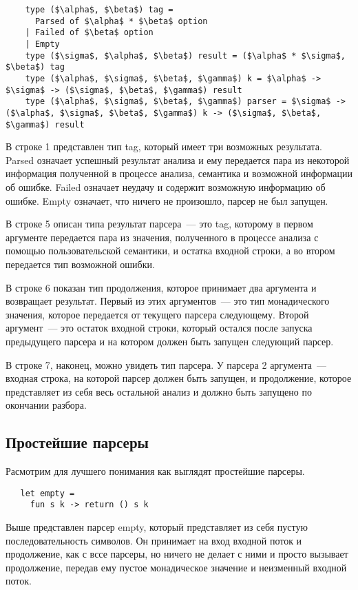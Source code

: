 \documentclass[conference]{IEEEtran}
\begin{document}
\begin{lstlisting}
    type ($\alpha$, $\beta$) tag =
      Parsed of $\alpha$ * $\beta$ option
    | Failed of $\beta$ option
    | Empty
    type ($\sigma$, $\alpha$, $\beta$) result = ($\alpha$ * $\sigma$, $\beta$) tag
    type ($\alpha$, $\sigma$, $\beta$, $\gamma$) k = $\alpha$ -> $\sigma$ -> ($\sigma$, $\beta$, $\gamma$) result
    type ($\alpha$, $\sigma$, $\beta$, $\gamma$) parser = $\sigma$ -> ($\alpha$, $\sigma$, $\beta$, $\gamma$) k -> ($\sigma$, $\beta$, $\gamma$) result
  \end{lstlisting}

В строке 1 представлен тип tag, который имеет три возможных результата. Parsed означает успешный результат анализа и ему передается пара из некоторой информация полученной в процессе анализа, семантика и возможной информации об ошибке. Failed означает неудачу и содержит возможную информацию об ошибке. Empty означает, что ничего не произошло, парсер не был запущен.

В строке 5 описан типа результат парсера~--- это tag, которому в первом аргументе передается пара из значения, полученного в процессе анализа с помощью пользовательской семантики, и остатка входной строки, а во втором передается тип возможной ошибки.

В строке 6 показан тип продолжения, которое принимает два аргумента и возвращает результат. Первый из этих аргументов~--- это тип монадического значения, которое передается от текущего парсера следующему. Второй аргумент~--- это остаток входной строки, который остался после запуска предыдущего парсера и на котором должен быть запущен следующий парсер.

В строке 7, наконец, можно увидеть тип парсера. У парсера 2 аргумента~--- входная строка, на которой парсер должен быть запущен, и продолжение, которое представляет из себя весь остальной анализ и должно быть запущено по окончании разбора.

\subsection{Простейшие парсеры}
Расмотрим для лучшего понимания как выглядят простейшие парсеры.

\begin{lstlisting}
   let empty =
     fun s k -> return () s k
\end{lstlisting}

Выше представлен парсер empty, который представляет из себя пустую последовательность символов. Он принимает на вход входной поток и продолжение, как с вссе парсеры, но ничего не делает с ними и просто вызывает продолжение, передав ему пустое монадическое значение и неизменный входной поток.
\end{document}
